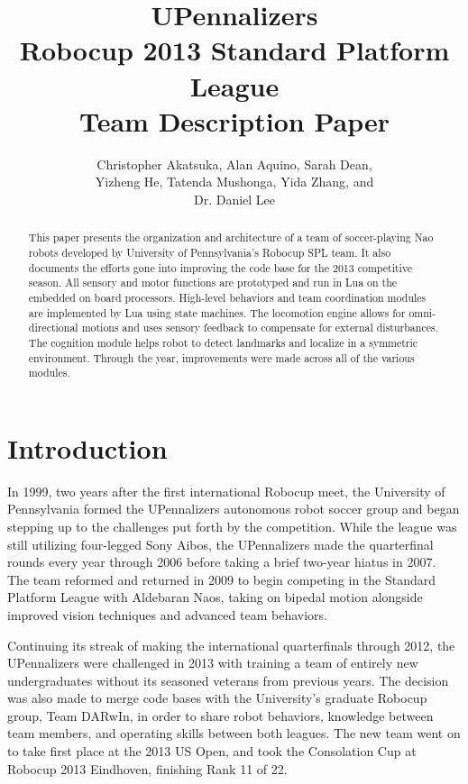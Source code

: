 \documentclass{article}
\title{UPennalizers \\Robocup 2013 Standard Platform League \\Team Description Paper}
\author{Christopher Akatsuka, Alan Aquino, Sarah Dean, \\Yizheng He, Tatenda Mushonga, Yida Zhang, and\\Dr. Daniel Lee}
\affil{General Robotics Automation, Sensing and Perception (GRASP) Laboratory \\University of Pennsylvania}
\date{} %
\begin{document}
\maketitle

\begin{abstract}
 	This paper presents the organization and architecture of a team of soccer-playing Nao robots developed by University of Pennsylvania's Robocup SPL team. It also documents the efforts gone into improving the code base for the 2013 competitive season. All sensory and motor functions are prototyped and run in Lua on the embedded on board processors. High-level behaviors and team coordination modules are implemented by Lua using state machines. The locomotion engine allows for omni-directional motions and uses sensory feedback to compensate for external disturbances. The cognition module helps robot to detect landmarks and localize in a symmetric environment. Through the year, improvements were made across all of the various modules. 
\end{abstract}

\pagebreak



\section{Introduction}
	In 1999, two years after the first international Robocup meet, the University of Pennsylvania formed the UPennalizers autonomous robot soccer group and began stepping up to the challenges put forth by the competition. While the league was still utilizing four-legged Sony Aibos, the UPennalizers made the quarterfinal rounds every year through 2006 before taking a brief two-year hiatus in 2007. The team reformed and returned in 2009 to begin competing in the Standard Platform League with Aldebaran Naos, taking on bipedal motion alongside improved vision techniques and advanced team behaviors. 

	Continuing its streak of making the international quarterfinals through 2012, the UPennalizers were challenged in 2013 with training a team of entirely new undergraduates without its seasoned veterans from previous years. The decision was also made to merge code bases with the University's graduate Robocup group, Team DARwIn, in order to share robot behaviors, knowledge between team members, and operating skills between both leagues. The new team went on to take first place at the 2013 US Open, and took the Consolation Cup at Robocup 2013 Eindhoven, finishing Rank 11 of 22.
\end{document}
